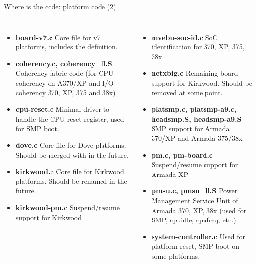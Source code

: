 \begin{frame}{Where is the code: platform code (2)}

\footnotesize
\begin{columns}
\begin{itemize}
\item {\bf board-v7.c} Core file for v7 platforms, includes the
   definition.
\item {\bf coherency.c, coherency_ll.S} Coherency fabric code (for CPU
  coherency on A370/XP and I/O coherency 370, XP, 375 and 38x)
\item {\bf cpu-reset.c} Minimal driver to handle the CPU reset
  register, used for SMP boot.
\item {\bf dove.c} Core file for Dove platforms. Should be merged with
   in the future.
\item {\bf kirkwood.c} Core file for Kirkwood platforms. Should be
  renamed  in the future.
\item {\bf kirkwood-pm.c} Suspend/resume support for Kirkwood
\end{itemize}
\begin{itemize}
\item {\bf mvebu-soc-id.c} SoC identification for 370, XP, 375, 38x
\item {\bf netxbig.c} Remaining board support for Kirkwood. Should be
  removed at some point.
\item {\bf platsmp.c, platsmp-a9.c, headsmp.S, headsmp-a9.S} SMP
  support for Armada 370/XP and Armada 375/38x
\item {\bf pm.c, pm-board.c} Suspend/resume support for Armada XP
\item {\bf pmsu.c, pmsu_ll.S} Power Management Service Unit of Armada
  370, XP, 38x (used for SMP, cpuidle, cpufreq, etc.)
\item {\bf system-controller.c} Used for platform reset, SMP boot on
  some platforms.
\end{itemize}
\end{columns}

\end{frame}

